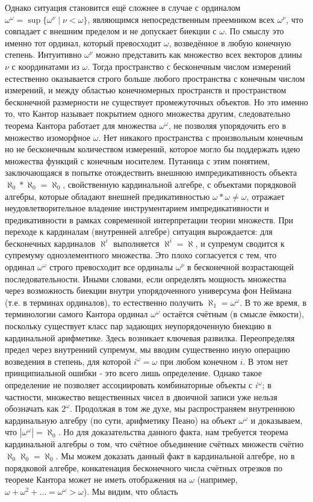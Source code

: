 \documentclass[12pt]{article}
\begin{document}
Однако ситуация становится ещё сложнее в случае с ординалом $\omega^{\omega} = \sup \{ \omega^{\nu} \mid \nu < \omega \}$, являющимся непосредственным преемником всех $\omega^{\nu}$, что совпадает с внешним пределом и не допускает биекции с $\omega$. По смыслу это именно тот ординал, который превосходит $\omega$, возведённое в любую конечную степень. Интуитивно $\omega^{\nu}$ можно представить как множество всех векторов длины $\nu$ с координатами из $\omega$. Тогда пространство с бесконечным числом измерений естественно оказывается строго больше любого пространства с конечным числом измерений, и между областью конечномерных пространств и пространством бесконечной размерности не существует промежуточных объектов. Но это именно то, что Кантор называет покрытием одного множества другим, следовательно теорема Кантора работает для множества $\omega^{\omega}$, не позволяя упорядочить его в множество изоморфное $\omega$. Нет никакого пространства с произвольным конечным но не бесконечным количеством измерений, которое могло бы поддержать идею множества функций с конечным носителем. Путаница с этим понятием, заключающаяся в попытке отождествить внешнюю импредикативность объекта $\aleph_0*\aleph_0 = \aleph_0$, свойственную кардинальной алгебре, с объектами порядковой алгебры, которые обладают внешней предикативностью $\omega*\omega \neq \omega$, отражает неудовлетворительное владение инструментарием импредикативности и предикативности в рамках современной интерпретации теории множеств. При переходе к кардиналам (внутренней алгебре) ситуация вырождается: для бесконечных кардиналов $\aleph^{i}$ выполняется $\aleph^{i} = \aleph$, и супремум сводится к супремуму одноэлементного множества. Это плохо согласуется с тем, что ординал $\omega^{\omega}$ строго превосходит все ординалы $\omega^{\nu}$ в бесконечной возрастающей последовательности. Иными словами, если определять мощность множества через возможность биекции внутри упорядоченного универсума фон Неймана (т.е. в терминах ординалов), то естественно получить $\aleph_1 = \omega^\omega$. В то же время, в терминологии самого Кантора ординал $\omega^\omega$ остаётся счётным (в смысле ёмкости), поскольку существует класс пар задающих неупорядоченную биекцию в кардинальной арифметике. Здесь возникает ключевая развилка. Переопределяя предел через внутренний супремум, мы вводим существенно иную операцию возведения в степень, для которой $i^{\omega} = \omega$ при любом конечном $i$. В этом нет принципиальной ошибки - это всего лишь определение. Однако такое определение не позволяет ассоциировать комбинаторные объекты с $i^{\omega}$; в частности, множество вещественных чисел в двоичной записи уже нельзя обозначать как $2^{\omega}$. Продолжая в том же духе, мы распространяем внутреннюю кардинальную алгебру (по сути, арифметику Пеано) на объект $\omega^{\omega}$ и доказываем, что $|\omega^{\omega}| = \aleph_0$. Но для доказательства данного факта, нам требуется теорема кардинальной алгебры о том, что счётное объединение счётных множеств счётно $\aleph_0\aleph_0 = \aleph_0$. Мы можем доказать данный факт в кардинальной алгебре, но в порядковой алгебре, конкатенация бесконечного числа счётных отрезков по теореме Кантора может не иметь отображения на $\omega$ (например, $\omega + \omega^2 + \dots = \omega^{\omega} > \omega$). Мы видим, что область 
\end{document}
